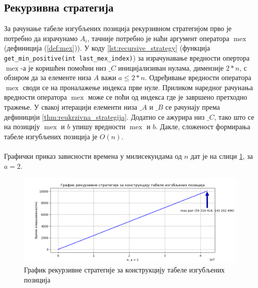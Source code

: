 \documentclass[a4paper]{article}
\DeclareMathOperator{\mex}{mex}
\begin{document}

\subsection{Рекурзивна стратегија}

За рачунање табеле изгубљених позиција рекурзивном стратегијом прво је потребно да израчунамо $ A_{i} $, тачније потребно је наћи аргумент оператора $ \mex $ (дефиниција (\ref{def:mex})). У коду \ref{lst:recursive_strategy} (функција \verb|get_min_positive(int last_mex_index)|) за израчунавање вредности опертора $ \mex $-а је коришћен помоћни низ $ \_C $ иницијализиван нулама, димензије $ 2*n $, с обзиром да за елементе низа $ A $ важи $ a \leq 2*n $. Одређивање вредности оператора $ \mex $  своди се на проналажење индекса прве нуле. Приликом наредног рачунања вредности оператора $ \mex $ може се поћи од индекса где је завршено претходно тражење. У свакој итерацији елементи низа $ \_A $ и $ \_B $ се рачунају према дефиницији \ref{thm:reukrzivna_strategija}. Додатно се ажурира низ $ \_C $, тако што се на позицију $ \mex $ и $ b $ упишу вредности $ \mex $ и $ b $. Дакле, сложеност формирања табеле изгубљених позиција је $ O(n) $.\\



\leavevmode\\
Графички приказ зависности времена у милисекундама од $ n $ дат је на слици \ref{fig:recursive}, за $ a = 2 $.

\begin{figure}[H]
	\begin{center}
		\includegraphics[width=\textwidth]{recursive.png}
	\end{center}
	\caption{График рекурзивне стратегије за конструкцију табеле изгубљених позиција}
	\label{fig:recursive}
\end{figure}
\end{document}
